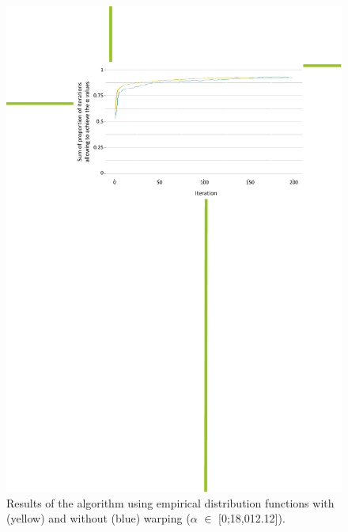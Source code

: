 \begin{figure}[!ht]
	\centering
	\includegraphics[trim = 4cm 16.6cm 2.2cm 3.5cm, clip, width=\textwidth]{Figures_Warping_resultats_courbes_algoCoco_0_18000.pdf}
	\caption{Results of the algorithm using empirical distribution functions \cite{hansen2010} with (yellow) and without (blue) warping ($\alpha$ $\in$ [0;18,012.12]).}\label{fig:algococo0}
\end{figure}

